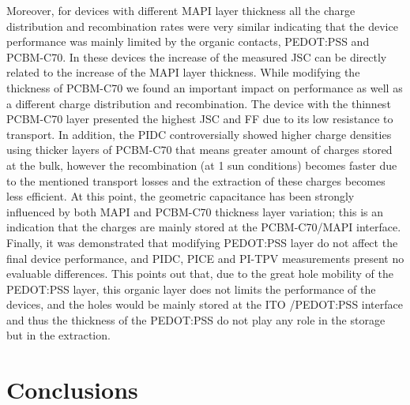 Moreover, for devices with different MAPI layer thickness all the charge distribution and recombination rates were very similar indicating that the device performance was mainly limited by the organic contacts, PEDOT:PSS and PCBM-C70. In these devices the increase of the measured JSC can be directly related to the increase of the MAPI layer thickness. While modifying the thickness of PCBM-C70 we found an important impact on performance as well as a different charge distribution and recombination. The device with the thinnest PCBM-C70 layer presented the highest JSC and FF due to its low resistance to transport. In addition, the PIDC controversially showed higher charge densities using thicker layers of PCBM-C70 that means greater amount of charges stored at the bulk, however the recombination (at 1 sun conditions) becomes faster due to the mentioned transport losses and the extraction of these charges becomes less efficient. At this point, the geometric capacitance has been strongly influenced by both MAPI and PCBM-C70 thickness layer variation; this is an indication that the charges are mainly stored at the PCBM-C70/MAPI interface.
Finally, it was demonstrated that modifying PEDOT:PSS layer do not affect the final device performance, and PIDC, PICE and PI-TPV measurements present no evaluable differences. This points out that, due to the great hole mobility of the PEDOT:PSS layer, this organic layer does not limits the performance of the devices, and the holes would be mainly stored at the ITO /PEDOT:PSS interface and thus the thickness of the PEDOT:PSS do not play any role in the storage but in the extraction.






\section{Conclusions}




